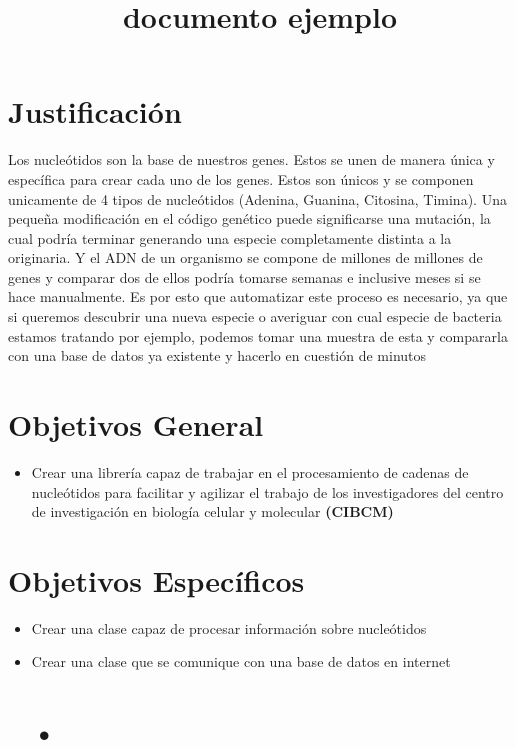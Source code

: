 \documentclass[10pt,a4paper,spanish] {article}
\begin{document}
\title{documento ejemplo}

\maketitle

\section{Justificación}

Los nucleótidos son la base de nuestros genes. Estos se unen de manera única y específica para crear cada uno de los genes. Estos son únicos y se componen unicamente de 4 tipos de nucleótidos (Adenina, Guanina, Citosina, Timina). 
Una pequeña modificación en el código genético puede significarse una mutación, la cual podría terminar generando una especie completamente distinta a la originaria. 
Y el ADN de un organismo se compone de millones de millones de genes y comparar dos de ellos podría tomarse semanas e inclusive meses si se hace manualmente. Es por esto que automatizar este proceso es necesario, ya que si queremos descubrir una nueva especie o averiguar con cual especie de bacteria estamos tratando por ejemplo, podemos tomar una muestra de esta y compararla con una base de datos ya existente y hacerlo en cuestión de minutos

\section{Objetivos General}

\begin{itemize}
\item Crear una librería capaz de trabajar en el procesamiento de cadenas de nucleótidos para facilitar y agilizar el trabajo de los investigadores del centro de investigación en biología celular y molecular \textbf{(CIBCM)}
\end{itemize}

\section{Objetivos Específicos}
\begin{itemize}
\item Crear una clase capaz  de procesar información sobre nucleótidos  
\item Crear una clase que se comunique con una base de datos en internet

\section{•}



\end{itemize}
\end{document}
